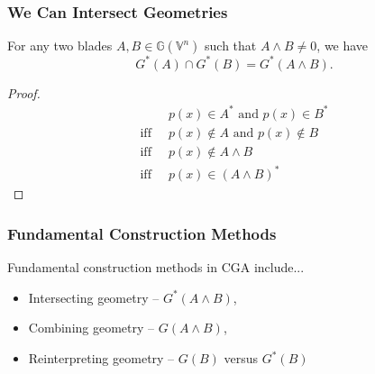 \documentclass{beamer}
\newcommand{\G}{\mathbb{G}}
\newcommand{\V}{\mathbb{V}}
\begin{document}
\begin{frame}
\frametitle{We Can Intersect Geometries}
For any two blades $A,B\in\G(\V^n)$ such that $A\wedge B\neq 0$,
we have
\begin{equation*}
G^*(A)\cap G^*(B)=G^*(A\wedge B).
\end{equation*}\pause
\begin{proof}
\begin{align*}
 & \mbox{$p(x)\in A^*$ and $p(x)\in B^*$} \\
\mbox{iff}\;\; & \mbox{$p(x)\not\in A$ and $p(x)\not\in B$} \\
\mbox{iff}\;\; & \mbox{$p(x)\not\in A\wedge B$} \\
\mbox{iff}\;\; & \mbox{$p(x)\in(A\wedge B)^*$}
\end{align*}
\end{proof}
\end{frame}

\begin{frame}
\frametitle{Fundamental Construction Methods}
Fundamental construction methods in CGA include...\pause
\begin{itemize}
\item \alert{Intersecting} geometry -- $G^*(A\wedge B)$,\pause
\item \alert{Combining} geometry -- $G(A\wedge B)$,\pause
\item \alert{Reinterpreting} geometry -- $G(B)$ versus $G^*(B)$
\end{itemize}
\end{frame}

%
%
%
%
\end{document}
